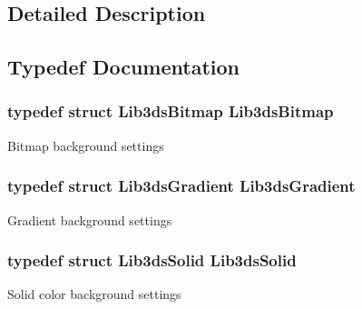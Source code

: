 \subsection{Detailed Description}


\subsection{Typedef Documentation}
\hypertarget{group__background_ga83052a1c5ed9a6fb4d9bc2343b35fbe5}{
\subsubsection[{Lib3ds\-Bitmap}]{\setlength{\rightskip}{0pt plus 5cm}typedef {\bf struct} {\bf Lib3ds\-Bitmap}  {\bf Lib3ds\-Bitmap}}}\label{group__background_ga83052a1c5ed9a6fb4d9bc2343b35fbe5}
Bitmap background settings \hypertarget{group__background_gaf3076a8fd0597515777e39cb4bbcd3ba}{
\subsubsection[{Lib3ds\-Gradient}]{\setlength{\rightskip}{0pt plus 5cm}typedef {\bf struct} {\bf Lib3ds\-Gradient}  {\bf Lib3ds\-Gradient}}}\label{group__background_gaf3076a8fd0597515777e39cb4bbcd3ba}
Gradient background settings \hypertarget{group__background_ga7656460cff3f1a2e6e0e9f7d61ab71d0}{
\subsubsection[{Lib3ds\-Solid}]{\setlength{\rightskip}{0pt plus 5cm}typedef {\bf struct} {\bf Lib3ds\-Solid}  {\bf Lib3ds\-Solid}}}\label{group__background_ga7656460cff3f1a2e6e0e9f7d61ab71d0}
Solid color background settings 

